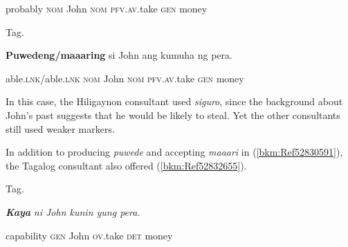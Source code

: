 \begin{stylelsIMT}
probably \textsc{nom} John \textsc{nom} \textsc{pfv.av}.take \textsc{gen} money
\end{stylelsIMT}

\begin{listWWNumiileveli}
\item 
\begin{listWWNumiilevelii}
\item 
\begin{stylelsLanginfo}
Tag.
\end{stylelsLanginfo}
\end{listWWNumiilevelii}
\end{listWWNumiileveli}
\begin{stylelsSourceline}
\textbf{Puwedeng/maaaring} si John ang kumuha ng pera.
\end{stylelsSourceline}

\begin{styleStandard}
able.\textsc{lnk}/able.\textsc{lnk} \textsc{nom} John \textsc{nom} \textsc{pfv.av}.take \textsc{gen} money
\end{styleStandard}

\begin{styleStandard}
In this case, the Hiligaynon consultant used \textit{siguro}, since the background about John’s past suggests that he would be likely to steal. Yet the other consultants still used weaker markers.
\end{styleStandard}

\begin{styleStandard}
In addition to producing \textit{puwede }and accepting \textit{maaari} in (\ref{bkm:Ref52830591}), the Tagalog consultant also offered (\ref{bkm:Ref52832655}).
\end{styleStandard}

\begin{listWWNumiileveli}
\item 
\begin{stylelsLanginfo}
\label{bkm:Ref52832655}Tag.
\end{stylelsLanginfo}
\end{listWWNumiileveli}
\begin{stylelsLanginfo}
\textbf{\textit{Kaya}}\textit{ ni John kunin yung pera.} 
\end{stylelsLanginfo}

\begin{stylelsLanginfo}
capability \textsc{gen} John \textsc{ov.}take \textsc{det} money
\end{stylelsLanginfo}

